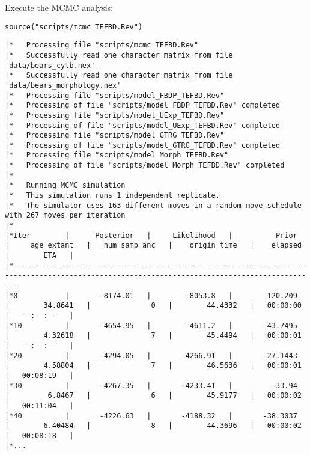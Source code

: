 Execute the MCMC analysis:
{\tt \begin{snugshade*}
\begin{lstlisting}
source("scripts/mcmc_TEFBD.Rev")
\end{lstlisting}
\end{snugshade*}}

{\tiny{\tt \begin{snugshade*}
\begin{lstlisting}
|*   Processing file "scripts/mcmc_TEFBD.Rev"
|*   Successfully read one character matrix from file 'data/bears_cytb.nex'
|*   Successfully read one character matrix from file 'data/bears_morphology.nex'
|*   Processing file "scripts/model_FBDP_TEFBD.Rev"
|*   Processing of file "scripts/model_FBDP_TEFBD.Rev" completed
|*   Processing file "scripts/model_UExp_TEFBD.Rev"
|*   Processing of file "scripts/model_UExp_TEFBD.Rev" completed
|*   Processing file "scripts/model_GTRG_TEFBD.Rev"
|*   Processing of file "scripts/model_GTRG_TEFBD.Rev" completed
|*   Processing file "scripts/model_Morph_TEFBD.Rev"
|*   Processing of file "scripts/model_Morph_TEFBD.Rev" completed
|*
|*   Running MCMC simulation
|*   This simulation runs 1 independent replicate.
|*   The simulator uses 163 different moves in a random move schedule with 267 moves per iteration
|*
|*Iter        |      Posterior   |     Likelihood   |          Prior   |     age_extant   |   num_samp_anc   |    origin_time   |    elapsed   |        ETA   |
|*---------------------------------------------------------------------------------------------------------------------------------------------
|*0           |       -8174.01   |        -8053.8   |       -120.209   |        34.8641   |              0   |        44.4332   |   00:00:00   |   --:--:--   |
|*10          |       -4654.95   |        -4611.2   |       -43.7495   |        4.32618   |              7   |        45.4494   |   00:00:01   |   --:--:--   |
|*20          |       -4294.05   |       -4266.91   |       -27.1443   |        4.58804   |              7   |        46.5636   |   00:00:01   |   00:08:19   |
|*30          |       -4267.35   |       -4233.41   |         -33.94   |         6.8467   |              6   |        45.9177   |   00:00:02   |   00:11:04   |
|*40          |       -4226.63   |       -4188.32   |       -38.3037   |        6.40484   |              8   |        44.3696   |   00:00:02   |   00:08:18   |
|*...
\end{lstlisting}
\end{snugshade*}}}

\bigskip
